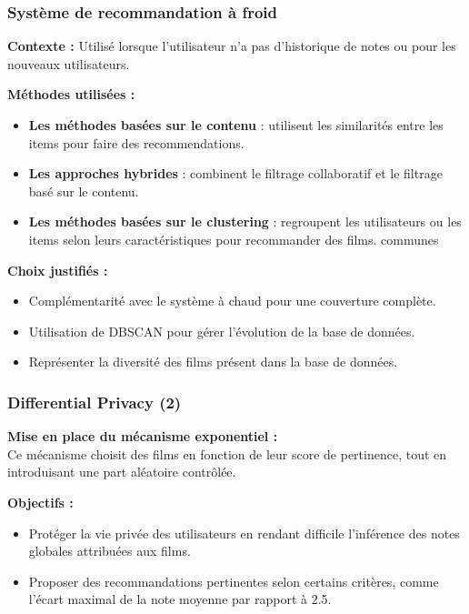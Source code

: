 \documentclass{beamer}
\begin{document}
    \begin{frame}
        \scriptsize
        \frametitle{Système de recommandation à froid}
        \textbf{Contexte :} Utilisé lorsque l’utilisateur n’a pas d’historique de notes ou pour les nouveaux utilisateurs.

        \vspace{0.3cm}
        \textbf{Méthodes utilisées : }
        \begin{itemize}
            \item \textbf{Les méthodes basées sur le contenu} : utilisent les similarités entre les items pour faire des recommendations.
            \item \textbf{Les approches hybrides} : combinent le filtrage collaboratif et le filtrage basé sur le contenu.
            \item \textbf{Les méthodes basées sur le clustering} : regroupent les utilisateurs ou les items selon leurs caractéristiques pour recommander des films.
    communes
        \end{itemize}

        \vspace{0.3cm}
        \textbf{Choix justifiés :}
        \begin{itemize}
            \item Complémentarité avec le système à chaud pour une couverture complète.
            \item Utilisation de DBSCAN pour gérer l'évolution de la base de données.
            \item Représenter la diversité des films présent dans la base de données.
        \end{itemize}
    \end{frame}

    \begin{frame}
        \scriptsize
        \frametitle{Differential Privacy (2)}
        \textbf{Mise en place du mécanisme exponentiel :}\\
        Ce mécanisme choisit des films en fonction de leur score de pertinence, tout en introduisant une part aléatoire contrôlée.

        \vspace{0.3cm}
        \textbf{Objectifs :}
        \begin{itemize}
            \item Protéger la vie privée des utilisateurs en rendant difficile l’inférence des notes globales attribuées aux films.
            \item Proposer des recommandations pertinentes selon certains critères, comme l’écart maximal de la note moyenne par rapport à 2.5.            
        \end{itemize}
    \end{frame}
\end{document}

